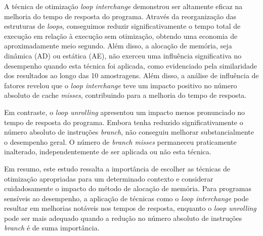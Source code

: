 \documentclass[12pt,a4paper]{article}
\begin{document}
A técnica de otimização \textit{loop interchange} demonstrou ser altamente eficaz na melhoria do tempo de resposta do programa. Através da reorganização das estruturas de \textit{loops}, conseguimos reduzir significativamente o tempo total de execução em relação à execução sem otimização, obtendo uma economia de aproximadamente meio segundo. Além disso, a alocação de memória, seja dinâmica (AD) ou estática (AE), não exerceu uma influência significativa no desempenho quando esta técnica foi aplicada, como evidenciado pela similaridade dos resultados ao longo das 10 amostragens. Além disso, a análise de influência de fatores revelou que o \textit{loop interchange} teve um impacto positivo no número absoluto de cache \textit{misses}, contribuindo para a melhoria do tempo de resposta. 

Em contraste, o \textit{loop unrolling} apresentou um impacto menos pronunciado no tempo de resposta do programa. Embora tenha reduzido significativamente o número absoluto de instruções \textit{branch}, não conseguiu melhorar substancialmente o desempenho geral. O número de \textit{branch misses} permaneceu praticamente inalterado, independentemente de ser aplicada ou não esta técnica.

Em resumo, este estudo ressalta a importância de escolher as técnicas de otimização apropriadas para um determinado contexto e considerar cuidadosamente o impacto do método de alocação de memória. Para programas sensíveis ao desempenho, a aplicação de técnicas como o \textit{loop interchange} pode resultar em melhorias notáveis nos tempos de resposta, enquanto o \textit{loop unrolling} pode ser mais adequado quando a redução no número absoluto de instruções \textit{branch} é de suma importância.
\end{document}
